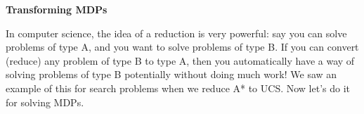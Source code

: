 \item {\bf Transforming MDPs}

In computer science, the idea of a reduction is very powerful:
say you can solve problems of type A,
and you want to solve problems of type B.
If you can convert (reduce) any problem of type B to type A,
then you automatically have a way of solving problems of type B
potentially without doing much work!
We saw an example of this for search problems when we reduce A* to UCS.
Now let's do it for solving MDPs.

\begin{enumerate}

  

\end{enumerate}
